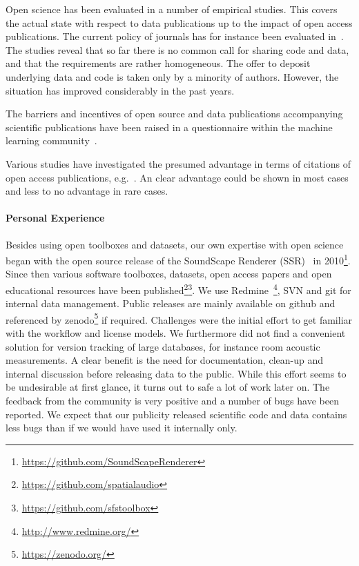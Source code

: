 \documentclass[a4paper, 10pt, twocolumn]{article}
\begin{document}
Open science has been evaluated in a number of empirical studies. This covers the
actual state with respect to data publications up to the impact of open access 
publications. The current policy of journals has for instance been evaluated in~\cite{Stodden2013:PLOS1,Alsheikh11:PLOS}. The studies reveal that so far there is 
no common call for sharing code and data, and that the requirements are rather 
homogeneous. The offer to deposit underlying data and code is taken only by a minority
of authors. However, the situation has improved considerably in the past years.

The barriers and incentives of open source and data publications accompanying 
scientific publications have been raised in a questionnaire within the machine 
learning community~\cite{}.

Various studies have investigated the presumed advantage in terms of citations of
open access publications, e.g.~\cite{Swan10:study,McCabe14:EI}. An clear advantage 
could be shown in most cases and less to no advantage in rare cases.


\paragraph*{Personal Experience}

Besides using open toolboxes and datasets, our own expertise with open science began 
with the open source release of the SoundScape Renderer (SSR)~\cite{Geier07:DEGA} in 
2010\footnote{\url{https://github.com/SoundScapeRenderer}}. Since then various software toolboxes, 
datasets, open access papers and open educational resources have been 
published\footnote{\url{https://github.com/spatialaudio}}\footnote{\url{https://github.com/sfstoolbox}}. 
We use Redmine~\footnote{\url{http://www.redmine.org/}}, SVN and git for internal data management. Public releases are mainly
available on github and referenced by zenodo\footnote{\url{https://zenodo.org/}} if required. Challenges were the initial
effort to get familiar with the workflow and license models. We furthermore did not find
a convenient solution for version tracking of large databases, for instance room 
acoustic measurements. A clear benefit is the need for documentation, clean-up and internal
discussion before releasing data to the public. While this effort seems to be undesirable at
first glance, it turns out to safe a lot of work later on. The feedback from the community
is very positive and a number of bugs have been reported. We expect that our publicity 
released scientific code and data contains less bugs than if we would have used it 
internally only. 
\end{document}
